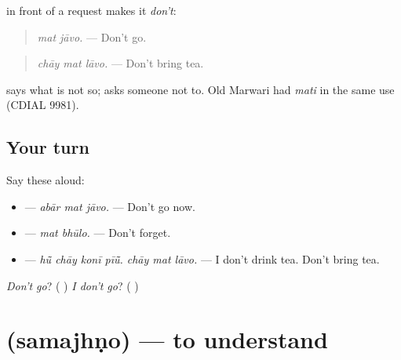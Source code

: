 \begin{grammarlens}[title={Grammar Lens: \mw{मत} before a request}]
\textbf{} in front of a request makes it \emph{don't}:

\begin{quote}
\textbf{ }
\end{quote}

\begin{quote}
\emph{mat jāvo.} — Don't go.
\end{quote}

\begin{quote}
\textbf{  }
\end{quote}

\begin{quote}
\emph{chāy mat lāvo.} — Don't bring tea.
\end{quote}

\textbf{} says what is not so; \textbf{} asks someone not to. Old Marwari had \emph{mati} in the same use (CDIAL 9981).
\end{grammarlens}

\subsection*{Your turn}
Say these aloud:

\begin{itemize}
\raggedright
  \item \textbf{  } — \emph{abār mat jāvo.} — Don't go now.
  \item \textbf{ } — \emph{mat bhūlo.} — Don't forget.
  \item \textbf{      } — \emph{hū̃ chāy konī pīū̃. chāy mat lāvo.} — I don't drink tea. Don't bring tea.
\end{itemize}

\begin{tcolorbox}[breakable,colback=teal!4,colframe=teal!35!black,title={Before you move on}]
\emph{Don't go}? (\textbf{ }) \emph{I don't go}? (\textbf{  })
\end{tcolorbox}
\section[\texorpdfstring{\mw{समझणो} (samajhṇo)}{समझणो (samajhṇo)}]{ (samajhṇo) — to understand}

